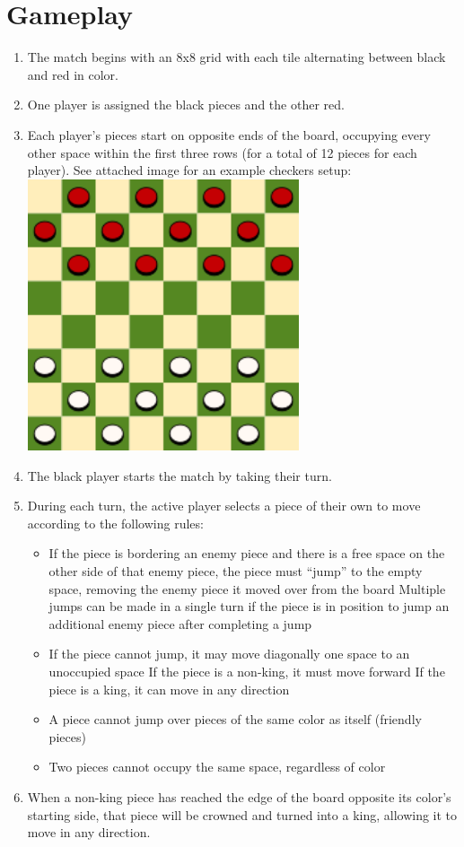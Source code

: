 \documentclass{scrreprt}
\begin{document}
\section{Gameplay}
\begin{enumerate}[label*=G\arabic*.]
	\item The match begins with an 8x8 grid with each tile alternating between black and red in color.
	\item One player is assigned the black pieces and the other red.
	\item Each player’s pieces start on opposite ends of the board, occupying every other space within the first three rows (for a total of 12 pieces for each player).
	\subitem See attached image for an example checkers setup:
	\subitem \includegraphics[width=8cm]{board.png}
	\item The black player starts the match by taking their turn.
	\item During each turn, the active player selects a piece of their own to move according to the following rules:
\begin{itemize}
    \item If the piece is bordering an enemy piece and there is a free space on the other side of that enemy piece, the piece must “jump” to the empty space, removing the enemy piece it moved over from the board
        \subitem Multiple jumps can be made in a single turn if the piece is in position to jump an additional enemy piece after completing a jump
    \item If the piece cannot jump, it may move diagonally one space to an unoccupied space
        \subitem If the piece is a non-king, it must move forward
        \subitem If the piece is a king, it can move in any direction
    \item A piece cannot jump over pieces of the same color as itself (friendly pieces)
    \item Two pieces cannot occupy the same space, regardless of color
\end{itemize}

\item When a non-king piece has reached the edge of the board opposite its color’s starting side, that piece will be crowned and turned into a king, allowing it to move in any direction.
\end{enumerate}
\end{document}
